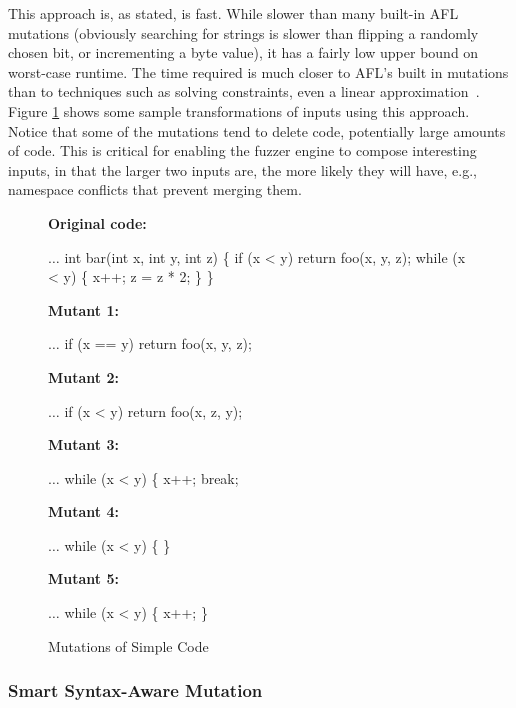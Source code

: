 This approach is, as stated, is fast.  While slower than many built-in
AFL mutations (obviously searching for strings is slower than flipping
a randomly chosen bit, or incrementing a byte value), it has a fairly
low upper bound on worst-case runtime.  The time required is much
closer to AFL's built in mutations than to techniques such as
solving constraints, even a linear
approximation~\cite{Eclipser}.  Figure \ref{fig:fopexample} shows some
sample transformations of inputs using this approach.  Notice that
some of the mutations tend to delete code, potentially large amounts
of code.  This is critical for enabling the fuzzer engine to compose
interesting inputs, in that the larger two inputs are, the
more likely they will have, e.g., namespace conflicts that prevent
merging them.

\begin{figure}
  \raggedright
  {\scriptsize
    {\bf Original code:}
\begin{code}
$\ldots$      
 int bar(int x, int y, int z) \{
   if (x < y)
      return foo(x, y, z);
   while (x < y) \{
      x++;
      z = z * 2;
   \}
\}
\end{code}
   {\bf Mutant 1:}
\begin{code}
$\ldots$      
   if (x == y)
      return foo(x, y, z);
\end{code}
   {\bf Mutant 2:}
\begin{code}
$\ldots$      
   if (x < y)
      return foo(x, z, y);
\end{code}
   {\bf Mutant 3:}
\begin{code}
$\ldots$      
   while (x < y) \{
      x++;
      break;
    \end{code}
   {\bf Mutant 4:}
\begin{code}
$\ldots$      
   while (x < y) \{
   \}
 \end{code}
 {\bf Mutant 5:}
\begin{code}
$\ldots$      
   while (x < y) \{
     x++;
   \}
 \end{code}

}
\caption{Mutations of  Simple Code}
\label{fig:fopexample}
\end{figure}

\subsubsection{Smart Syntax-Aware Mutation}
\label{strat-syntax-aware}

